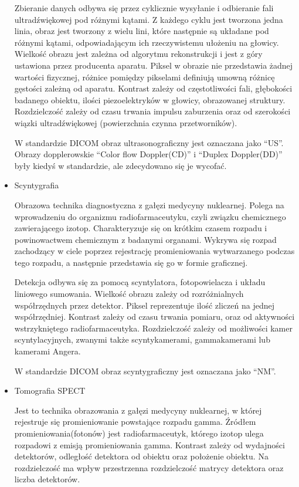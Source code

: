 \begin{itemize}
          Zbieranie danych odbywa się przez cyklicznie wysyłanie i odbieranie fali ultradźwiękowej pod różnymi kątami.
          Z każdego cyklu jest tworzona jedna linia, obraz jest tworzony z wielu lini, które następnie są układane pod różnymi kątami, odpowiadającym ich rzeczywistemu ułożeniu na głowicy.
          Wielkość obrazu jest zależna od algorytmu rekonstrukcji i jest z góry ustawiona przez producenta aparatu.
          Piksel w obrazie nie przedstawia żadnej wartości fizycznej, różnice pomiędzy pikselami definiują umowną różnicę gęstości zależną od aparatu.
          Kontrast zależy od częstotliwości fali, głębokości badanego obiektu, ilości piezoelektryków w głowicy, obrazowanej struktury.
          Rozdzielczość zależy od czasu trwania impulsu zaburzenia oraz od szerokości wiązki ultradźwiękowej (powierzchnia czynna przetworników).

          W standardzie DICOM obraz ultrasonograficzny jest oznaczana jako \enquote{US}.
          Obrazy dopplerowskie \enquote{Color flow Doppler(CD)} i \enquote{Duplex Doppler(DD)} były kiedyś w standardzie, ale zdecydowano się je wycofać.

    \item Scyntygrafia

          Obrazowa technika diagnostyczna z gałęzi medycyny nuklearnej.
          Polega na wprowadzeniu do organizmu radiofarmaceutyku, czyli związku chemicznego zawierającego izotop.
          Charakteryzuje się on krótkim czasem rozpadu i powinowactwem chemicznym z badanymi organami.
          Wykrywa się rozpad zachodzący w ciele poprzez rejestrację promieniowania wytwarzanego podczas tego rozpadu, a następnie przedstawia się go w formie graficznej.

          Detekcja odbywa się za pomocą scyntylatora, fotopowielacza i układu liniowego sumowania.
          Wielkość obrazu zależy od rozróżnialnych współrzędnych przez detektor.
          Piksel reprezentuje ilość zliczeń na jednej współrzędniej.
          Kontrast zależy od czasu trwania pomiaru, oraz od aktywności wstrzykniętego radiofarmaceutyka.
          Rozdzielczość zależy od możliwości kamer scyntylacyjnych, zwanymi także scyntykamerami, gammakamerami lub kamerami Angera.

          W standardzie DICOM obraz scyntygraficzny jest oznaczana jako \enquote{NM}.

    \item Tomografia SPECT

          Jest to technika obrazowania  z gałęzi medycyny nuklearnej, w której rejestruje się promieniowanie powstające rozpadu gamma.
          Źródłem promieniowania(fotonów) jest radiofarmaceutyk, którego izotop ulega rozpadowi z emisją promieniowania gamma.
          Kontrast zależy od wydajności detektorów, odległość detektora od obiektu oraz położenie obiektu.
          Na rozdzielczość ma wpływ przestrzenna rozdzielczość matrycy detektora oraz liczba detektorów.


\end{itemize}
